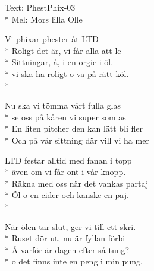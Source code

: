 \begin{SongText}
    \begin{SongInfo}
        Text: PhestPhix-03\\*%
        Mel: Mors lilla Olle
    \end{SongInfo}
    \begin{Verse}
        Vi phixar phester åt LTD\\*%
        Roligt det är, vi får alla att le\\*%
        Sittningar, å, i en orgie i öl.\\*%
        vi ska ha roligt o va på rätt köl.\\*%
    \end{Verse}
    \begin{Verse}
        Nu ska vi tömma vårt fulla glas\\*%
        se oss på kåren vi super som as\\*%
        En liten pitcher den kan lätt bli fler\\*%
        Och på vår sittning där vill vi ha mer
    \end{Verse}
    \begin{Verse}
        LTD festar alltid med fanan i topp\\*%
        även om vi får ont i vår knopp.\\*%
        Räkna med oss när det vankas partaj\\*%
        Öl o en cider och kanske en paj.\\*%
    \end{Verse}
    \begin{Verse}
        När ölen tar slut, ger vi till ett skri.\\*%
        Ruset dör ut, nu är fyllan förbi\\*%
        Å varför är dagen efter så tung?\\*%
        o det finns inte en peng i min pung.
    \end{Verse}
\end{SongText}
